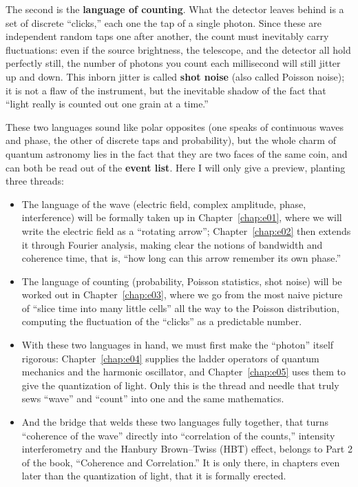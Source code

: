 The second is the \textbf{language of counting}. What the detector leaves behind is a set of discrete ``clicks,'' each one the tap of a single photon. Since these are independent random taps one after another, the count must inevitably carry fluctuations: even if the source brightness, the telescope, and the detector all hold perfectly still, the number of photons you count each millisecond will still jitter up and down. This inborn jitter is called \textbf{shot noise} (also called Poisson noise); it is not a flaw of the instrument, but the inevitable shadow of the fact that ``light really is counted out one grain at a time.''

These two languages sound like polar opposites (one speaks of continuous waves and phase, the other of discrete taps and probability), but the whole charm of quantum astronomy lies in the fact that they are two faces of the same coin, and can both be read out of the \textbf{event list}. Here I will only give a preview, planting three threads:

\begin{itemize}
  \item The language of the wave (electric field, complex amplitude, phase, interference) will be formally taken up in Chapter~\ref{chap:e01}, where we will write the electric field as a ``rotating arrow''; Chapter~\ref{chap:e02} then extends it through Fourier analysis, making clear the notions of bandwidth and coherence time, that is, ``how long can this arrow remember its own phase.''
  \item The language of counting (probability, Poisson statistics, shot noise) will be worked out in Chapter~\ref{chap:e03}, where we go from the most naive picture of ``slice time into many little cells'' all the way to the Poisson distribution, computing the fluctuation of the ``clicks'' as a predictable number.
  \item With these two languages in hand, we must first make the ``photon'' itself rigorous: Chapter~\ref{chap:e04} supplies the ladder operators of quantum mechanics and the harmonic oscillator, and Chapter~\ref{chap:e05} uses them to give the quantization of light. Only this is the thread and needle that truly sews ``wave'' and ``count'' into one and the same mathematics.
  \item And the bridge that welds these two languages fully together, that turns ``coherence of the wave'' directly into ``correlation of the counts,'' intensity interferometry and the Hanbury Brown--Twiss (HBT) effect, belongs to Part 2 of the book, ``Coherence and Correlation.'' It is only there, in chapters even later than the quantization of light, that it is formally erected.
\end{itemize}

